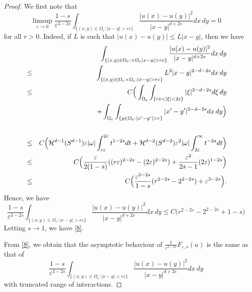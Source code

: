 \documentclass[10pt,a4paper]{amsart}
\newcommand{\e}{\varepsilon}
\begin{document}
\begin{proof}
We first note that 
\begin{equation}\label{8}
\limsup_{\e\to 0} \frac{1-s}{\e^{3-2s}} \int_{\{(x,y)\in\Omega_\e: |x-y|>r\e\}}\frac{|u(x)-u(y)|^2}{|x-y|^{d+2s}} dx\,dy=0
\end{equation}
for all $r>0$.
Indeed, if $L$ is such that $|u(x)-u(y)|\le L|x-y|$, then we have
\begin{eqnarray*}&&
\hskip-1cm\int_{\{(x,y)\in\Omega_\e:\times\Omega_\e |x-y|>r\e\}}\frac{|u(x)-u(y)|^2}{|x-y|^{d+2s}} dx\,dy\\
&\le& \int_{\{(x,y)\in\Omega_\e\times\Omega_\e: |x-y|>r\e\}}L^2|x-y|^{2-d-2s} dx\,dy\\
&\le& C\Big(\int_{\Omega_\e} \int_{\{r\e<|\xi|<2\e\}}|\xi|^{2-d-2s} d\xi\,dy\\
&&+
\int_{\Omega_\e}\int_{\{y\in\Omega_\e: |x'-y'|>\e\}}|x'-y'|^{2-d-2s} dx\,dy\Big)\\\\
&\le& C\Big( \mathcal H^{d-1}(S^{d-1})\e|\omega| \int_{r\e}^{2\e}t^{1-2s} dt +
\mathcal H^{d-2}(S^{d-2})\e^2 |\omega| \int_{2\e}^{\infty}t^{-2s}dt\Big)
\\
&\le& C\Big(\frac{\e}{2(1-s)}((r\e)^{2-2s}-(2\e)^{2-2s})+\frac{\e^2}{2s-1}(2\e)^{1-2s}\Big)\\
&\le& C\Big( \frac{\e^{3-2s}}{1-s}(r^{2-2s}-2^{2-2s})+ \e^{3-2s}\Big).
\end{eqnarray*}
Hence, we have
\begin{equation}\label{a1}
\frac{1-s}{\e^{3-2s}} \int_{\{(x,y)\in\Omega_\e: |x-y|>r\e\}}\frac{|u(x)-u(y)|^2}{|x-y|^{d+2s}} dx\,dy\le C\big(r^{2-2s}-2^{2-2s}+ 1-s\big)
\end{equation}
Letting $s\to 1$, we have \eqref{8}.

From \eqref{8}, we obtain that the asymptotic behaviour of $\frac{1}{\e^{2-2s}}F_{\e,s}(u)$ is the same as that
of
$$
\frac{1-s}{\e^{3-2s}} \int_{\{(x,y)\in\Omega_\e: |x-y|<r\e\}}\frac{|u(x)-u(y)|^2}{|x-y|^{d+2s}} dx\,dy
$$
with truncated range of interactions.


\end{proof}
\end{document}
